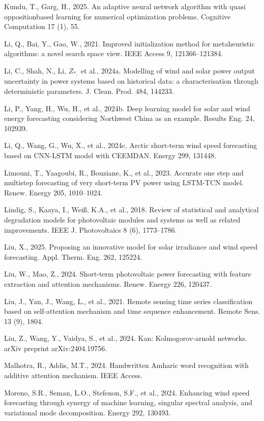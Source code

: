 \documentclass[
  10
]{article}
\begin{document}
Kundu, T., Garg, H., 2025. An adaptive neural network algorithm with
quasi oppositionbased learning for numerical optimization problems.
Cognitive Computation 17 (1), 55.

Li, Q., Bai, Y., Gao, W., 2021. Improved initialization method for
metaheuristic algorithms: a novel search space view. IEEE Access 9,
121366--121384.

Li, C., Shah, N., Li, \(Z _ { * , }\) et al., 2024a. Modelling of wind
and solar power output uncertainty in power systems based on historical
data: a characterisation through deterministic parameters. J. Clean.
Prod. 484, 144233.

Li, P., Yang, H., Wu, H., et al., 2024b. Deep learning model for solar
and wind energy forecasting considering Northwest China as an example.
Results Eng. 24, 102939.

Li, Q., Wang, G., Wu, X., et al., 2024c. Arctic short-term wind speed
forecasting based on CNN-LSTM model with CEEMDAN. Energy 299, 131448.

Limouni, T., Yaagoubi, R., Bouziane, K., et al., 2023. Accurate one step
and multistep forecasting of very short-term PV power using LSTM-TCN
model. Renew. Energy 205, 1010--1024.

Lindig, S., Kaaya, I., Weiß, K.A., et al., 2018. Review of statistical
and analytical degradation models for photovoltaic modules and systems
as well as related improvements. IEEE J. Photovoltaics 8 (6),
1773--1786.

Liu, X., 2025. Proposing an innovative model for solar irradiance and
wind speed forecasting. Appl. Therm. Eng. 262, 125224.

Liu, W., Mao, Z., 2024. Short-term photovoltaic power forecasting with
feature extraction and attention mechanisms. Renew. Energy 226, 120437.

Liu, J., Yan, J., Wang, L., et al., 2021. Remote sensing time series
classification based on self-attention mechanism and time sequence
enhancement. Remote Sens. 13 (9), 1804.

Liu, Z., Wang, Y., Vaidya, S., et al., 2024. Kan: Kolmogorov-arnold
networks. arXiv preprint arXiv:2404.19756.

Malhotra, R., Addis, M.T., 2024. Handwritten Amharic word recognition
with additive attention mechanism. IEEE Access.

Moreno, S.R., Seman, L.O., Stefenon, S.F., et al., 2024. Enhancing wind
speed forecasting through synergy of machine learning, singular spectral
analysis, and variational mode decomposition. Energy 292, 130493.
\end{document}
